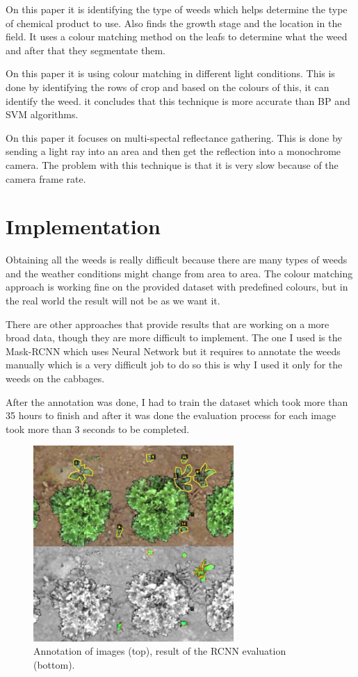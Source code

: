 \documentclass[journal]{IEEEtran}
\begin{document}
On this paper \cite{weed_control4} it is identifying the type of weeds which helps determine the type of chemical product to use. Also finds the growth stage and the location in the field. It uses a colour matching method on the leafs to determine what the weed and after that they segmentate them. 

On this paper \cite{weed_control5} it is using colour matching in different light conditions. This is done by identifying the rows of crop and based on the colours of this, it can identify the weed. it concludes that this technique is more accurate than BP and SVM algorithms.

On this paper \cite{weed_control5} it focuses on multi-spectal reflectance gathering. This is done by sending a light ray into an area and then get the reflection into a monochrome camera. The problem with this technique is that it is very slow because of the camera frame rate.


\section{Implementation}
Obtaining all the weeds is really difficult because there are many types of weeds and the weather conditions might change from area to area. The colour matching approach is working fine on the provided dataset with predefined colours, but in the real world the result will not be as we want it. 

There are other approaches that provide results that are working on a more broad data, though they are more difficult to implement. The one I used is the Mask-RCNN which uses Neural Network but it requires to annotate the weeds manually which is a very difficult job to do so this is why I used it only for the weeds on the cabbages.

After the annotation was done, I had to train the dataset which took more than 35 hours to finish and after it was done the evaluation process for each image took more than 3 seconds to be completed.

\begin{figure}[ht]
\includegraphics[width=3in]{cnn}
\caption{Annotation of images (top), result of the RCNN evaluation (bottom).}
\label{annotation_cnn}
\end{figure}
\end{document}
